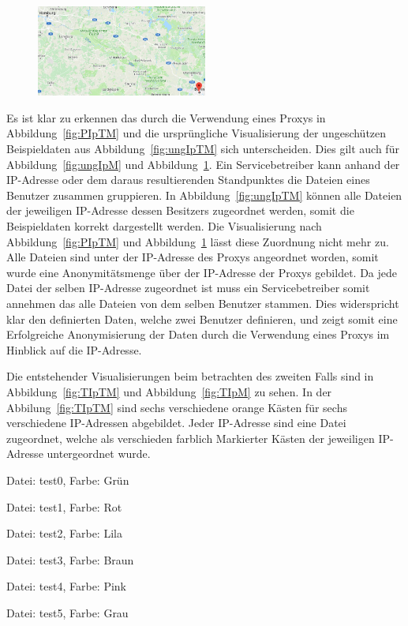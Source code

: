 \documentclass[
    fontsize=12pt,
    headings=small,
    parskip=half,           %
    bibliography=totoc,
    numbers=noenddot,       %
    open=any,               %
    ]{scrreprt}
\begin{document}
\begin{figure}[H]
\includegraphics[width=0.5\textwidth , height=0.2\textheight]{../pic/IP-Proxy-SetB.PNG}
\label{fig:PIpM}
\end{figure}

Es ist klar zu erkennen das durch die Verwendung eines Proxys in Abbildung~\ref{fig:PIpTM} und die ursprüngliche Visualisierung der ungeschützen Beispieldaten aus Abbildung~\ref{fig:ungIpTM} sich unterscheiden. 
Dies gilt auch für Abbildung~\ref{fig:ungIpM} und Abbildung~\ref{fig:PIpM}.
Ein Servicebetreiber kann anhand der IP-Adresse oder dem daraus resultierenden Standpunktes die Dateien eines Benutzer zusammen gruppieren.
In Abbildung~\ref{fig:ungIpTM} können alle Dateien der jeweiligen IP-Adresse dessen Besitzers zugeordnet werden, somit die Beispieldaten korrekt dargestellt werden.
Die Visualisierung nach Abbildung~\ref{fig:PIpTM} und Abbildung~\ref{fig:PIpM} lässt diese Zuordnung nicht mehr zu. 
Alle Dateien sind unter der IP-Adresse des Proxys angeordnet worden, somit wurde eine Anonymitätsmenge über der IP-Adresse der Proxys gebildet.
Da jede Datei der selben IP-Adresse zugeordnet ist muss ein Servicebetreiber somit annehmen das alle Dateien von dem selben Benutzer stammen.
Dies widerspricht klar den definierten Daten, welche zwei Benutzer definieren, und zeigt somit eine Erfolgreiche Anonymisierung der Daten durch die Verwendung eines Proxys im Hinblick auf die IP-Adresse.

Die entstehender Visualisierungen beim betrachten des zweiten Falls sind in Abbildung~\ref{fig:TIpTM} und Abbildung~\ref{fig:TIpM} zu sehen.
In der Abbilung~\ref{fig:TIpTM} sind sechs verschiedene orange Kästen für sechs verschiedene IP-Adressen abgebildet.
Jeder IP-Adresse sind eine Datei zugeordnet, welche als verschieden farblich Markierter Kästen der jeweiligen IP-Adresse untergeordnet wurde.
\begin{description}[style=nextline]
\item[81.7.10.29] Datei: test0, Farbe: Grün
\item[129.13.131.140] Datei: test1, Farbe: Rot
\item[2.202.33.28] Datei: test2, Farbe: Lila
\item[81.169.133.228] Datei: test3, Farbe: Braun
\item[85.197.58.203] Datei: test4, Farbe: Pink
\item[178.63.80.54] Datei: test5, Farbe: Grau
\end{description}
\end{document}
